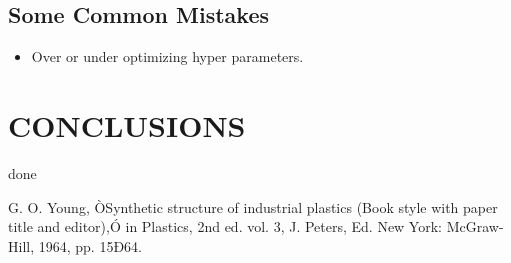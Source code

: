 \documentclass[letterpaper, 10 pt, conference]{ieeeconf}  %
\begin{document}
\subsection{Some Common Mistakes}
\begin{itemize}


\item Over or under optimizing hyper parameters.
\end{itemize}

\section{CONCLUSIONS}
done

\addtolength{\textheight}{-12cm}
                                  




\begin{thebibliography}{99}

 G. O. Young, ÒSynthetic structure of industrial plastics (Book style with paper title and editor),Ó 	in Plastics, 2nd ed. vol. 3, J. Peters, Ed.  New York: McGraw-Hill, 1964, pp. 15Ð64.







\end{thebibliography}
\end{document}
